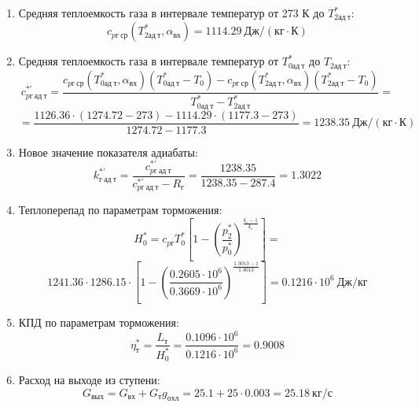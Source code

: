 \documentclass[a4paper,10pt]{article}
\begin{document}
\begin{enumerate}
        \item Средняя теплоемкость газа в интервале температур от 273 К до $T_{2ад\ т}^*$:
        \[
            c_{pг\ ср} (T_{2ад\ т}^*, \alpha_{вх}) =
            1114.29 \ Дж/(кг \cdot К)
        \]

        \item Средняя теплоемкость газа в интервале температур от $T_{0ад\ т}^*$ до $T_{2ад\ т}$:
        \[
            c_{pг\ ад\ т}^{*\prime} = \frac{
		        c_{pг\ ср}(T_{0ад\ т}^*, \alpha_{вх}) (T_{0ад\ т}^* - T_0) - c_{pг\ ср}(T_{2ад\ т}^*, \alpha_{вх}) (T_{2ад\ т}^* - T_0)
		    }{
		        T_{0ад\ т}^* - T_{2ад\ т}^*} =\]
        \[    =\frac{
		        1126.36 \cdot
                (1274.72 - 273) -
		        1114.29 \cdot
                (1177.3 - 273)
		    }{
		        1274.72 - 1177.3} =
		    1238.35 \ Дж / (кг \cdot К)
        \]

        \item Новое значение показателя адиабаты:
        \[
            k_{г\ ад\ т}^{*\prime} = \frac{c_{pг\ ад\ т}^{*\prime}}{c_{pг\ ад\ т}^{*\prime} - R_г} =
                \frac{
                    1238.35
                }{
                    1238.35 - 287.4
                }
            = 1.3022
        \]

        \item Теплоперепад по параметрам торможения:
        \[
            H_0^* = c_{pг} T_0^* \left[
                        1 - \left(
                                \frac{p_2^*}{p_0^*}
                            \right) ^
                        \frac{k_г - 1}{k_г}
                    \right] =\]
        \[    1241.36 \cdot 1286.15 \cdot
                    \left[
                        1 - \left(
                                \frac{
                                    0.2605 \cdot 10^6
                                }{
                                    0.3669 \cdot 10^6
                                }
                            \right) ^
                        \frac{1.3013 - 1}{1.3013}
                    \right]
            = 0.1216 \cdot 10^6 \ Дж/кг
        \]

        \item КПД по параметрам торможения:
        \[
            \eta_т^* = \frac{ L_т }{ H_0^* } =
                \frac{
                    0.1096 \cdot 10^6
                }{
                    0.1216 \cdot 10^6 } =
            0.9008
        \]

        \item Расход на выходе из ступени:
        \[
            G_{вых} = G_{вх} + G_т g_{охл} =
                25.1 + 25 \cdot
                0.003 =
            25.18 \ кг/с
        \]


\end{enumerate}
\end{document}
